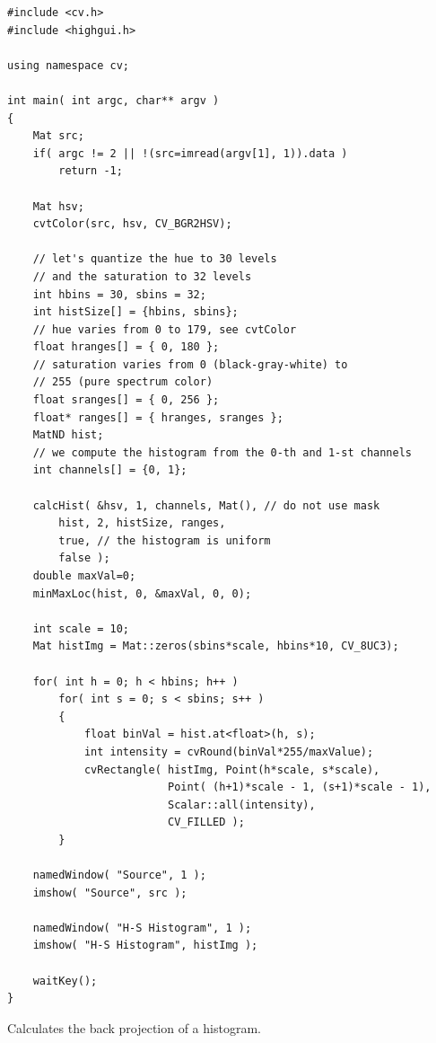 \begin{lstlisting}
#include <cv.h>
#include <highgui.h>

using namespace cv;

int main( int argc, char** argv )
{
    Mat src;
    if( argc != 2 || !(src=imread(argv[1], 1)).data )
        return -1;

    Mat hsv;
    cvtColor(src, hsv, CV_BGR2HSV);

    // let's quantize the hue to 30 levels
    // and the saturation to 32 levels
    int hbins = 30, sbins = 32;
    int histSize[] = {hbins, sbins};
    // hue varies from 0 to 179, see cvtColor
    float hranges[] = { 0, 180 };
    // saturation varies from 0 (black-gray-white) to
    // 255 (pure spectrum color)
    float sranges[] = { 0, 256 };
    float* ranges[] = { hranges, sranges };
    MatND hist;
    // we compute the histogram from the 0-th and 1-st channels
    int channels[] = {0, 1};
    
    calcHist( &hsv, 1, channels, Mat(), // do not use mask
        hist, 2, histSize, ranges,
        true, // the histogram is uniform
        false );
    double maxVal=0;
    minMaxLoc(hist, 0, &maxVal, 0, 0);
    
    int scale = 10;
    Mat histImg = Mat::zeros(sbins*scale, hbins*10, CV_8UC3);        

    for( int h = 0; h < hbins; h++ )
        for( int s = 0; s < sbins; s++ )
        {
            float binVal = hist.at<float>(h, s);
            int intensity = cvRound(binVal*255/maxValue);
            cvRectangle( histImg, Point(h*scale, s*scale),
                         Point( (h+1)*scale - 1, (s+1)*scale - 1),
                         Scalar::all(intensity),
                         CV_FILLED );
        }

    namedWindow( "Source", 1 );
    imshow( "Source", src );

    namedWindow( "H-S Histogram", 1 );
    imshow( "H-S Histogram", histImg );

    waitKey();
}
\end{lstlisting}


Calculates the back projection of a histogram.

